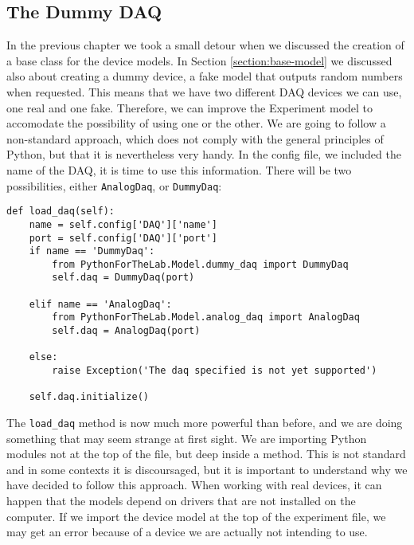 
\subsection{The Dummy DAQ}\label{subsection:loading-dummy-daq}
In the previous chapter we took a small detour when we discussed the creation of a base class for the device models. In Section \ref{section:base-model} we discussed also about creating a dummy device, a fake model that outputs random numbers when requested. This means that we have two different DAQ devices we can use, one real and one fake. Therefore, we can improve the Experiment model to accomodate the possibility of using one or the other. We are going to follow a non-standard approach, which does not comply with the general principles of Python, but that it is nevertheless very handy. In the config file, we included the name of the DAQ, it is time to use this information. There will be two possibilities, either \texttt{AnalogDaq}, or \texttt{DummyDaq}:

\begin{verbatim}
def load_daq(self):
    name = self.config['DAQ']['name']
    port = self.config['DAQ']['port']
    if name == 'DummyDaq':
        from PythonForTheLab.Model.dummy_daq import DummyDaq
        self.daq = DummyDaq(port)

    elif name == 'AnalogDaq':
        from PythonForTheLab.Model.analog_daq import AnalogDaq
        self.daq = AnalogDaq(port)

    else:
        raise Exception('The daq specified is not yet supported')

    self.daq.initialize()
\end{verbatim}

The \texttt{load\_daq} method is now much more powerful than before, and we are doing something that may seem strange at first sight. We are importing Python modules not at the top of the file, but deep inside a method. This is not standard and in some contexts it is discoursaged, but it is important to understand why we have decided to follow this approach. When working with real devices, it can happen that the models depend on drivers that are not installed on the computer. If we import the device model at the top of the experiment file, we may get an error because of a device we are actually not intending to use.

